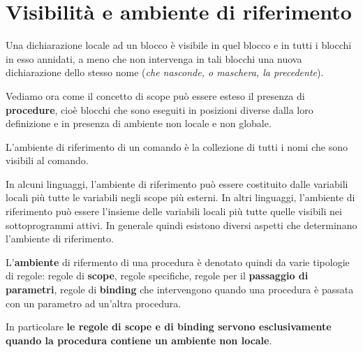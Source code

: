 \documentclass[oneside,a4paper,11pt]{book}
\theoremstyle{italicstyle}
\theoremstyle{normStyle}
\begin{document}
\section{Visibilità e ambiente di riferimento}
\begin{tcolorbox}[title ={Regola di visibilità}]
  Una dichiarazione locale ad un blocco è visibile in quel blocco e in tutti i blocchi in esso annidati, a meno che non intervenga 
  in tali blocchi una nuova dichiarazione dello stesso nome (\textit{che nasconde, 
  o maschera, la precedente}).
\end{tcolorbox}
Vediamo ora come il concetto di scope può essere esteso il presenza di \textbf{procedure},
cioè blocchi che sono eseguiti in posizioni diverse dalla loro definizione e in presenza di ambiente non
locale e non globale.
\begin{tcolorbox}[title = {Ambiente di riferimento}]
  L'ambiente di riferimento di un comando è la collezione di tutti i 
  nomi che sono visibili al comando.
\end{tcolorbox}
In alcuni linguaggi, l'ambiente di riferimento può essere costituito dalle variabili 
locali più tutte le variabili negli scope più esterni. In altri linguaggi, 
l'ambiente di riferimento può essere l'insieme delle variabili locali 
più tutte quelle visibili nei sottoprogrammi attivi. In 
generale quindi esistono diversi aspetti che determinano l'ambiente di riferimento.

L'\textbf{ambiente} di rifermento di una procedura è denotato quindi da varie tipologie di regole:
regole di \textbf{scope}, regole specifiche, regole per il \textbf{passaggio di parametri}, regole di \textbf{binding}
che intervengono quando una procedura è passata con un parametro ad un'altra procedura.

In particolare \textbf{le regole di scope e di binding servono 
esclusivamente quando la procedura contiene un ambiente non locale}.
\end{document}
